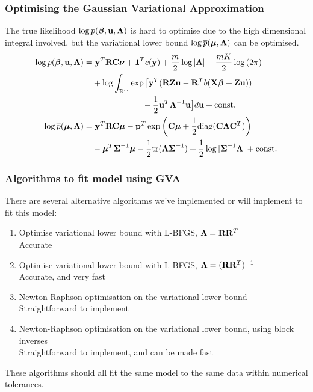 \documentclass{beamer}
\begin{document}
\begin{frame}
\frametitle{Optimising the Gaussian Variational Approximation}
The true likelihood $\log p({\boldsymbol \beta}, {\bf u}, {\boldsymbol \Lambda})$ is hard to optimise due 
to the high dimensional integral involved, but the variational lower bound $\log \overline{p}({\boldsymbol \mu}, {\boldsymbol \Lambda})$ can be optimised.
\begin{align*}
\log p({\boldsymbol \beta}, {\bf u}, {\boldsymbol \Lambda}) &= {\bf y}^T {\bf R} {\bf C} {\boldsymbol \nu} + {\bf 1}^T c({\bf y}) + \frac{m}{2} \log |{\boldsymbol \Lambda}| - \frac{mK}{2} \log{(2 \pi)}\\
&\quad + \log  \int_{\mathbb{R}^{m}} \exp \big[ {\bf y}^T ({\bf R} {\bf Z} {\bf u} - {\bf R}^T b( {\bf X} {\boldsymbol \beta} + {\bf Z} {\bf u})) \\
 &\quad \quad \quad \quad \quad \quad \quad - {\frac{1}{2}} {{\bf u}^T {\boldsymbol \Lambda}^{-1} {\bf u} } \big] d {\bf u} + \text{const.}\\
\log \overline{p}({\boldsymbol \mu}, {\boldsymbol \Lambda}) &= {\bf y}^T {\bf R} {\bf C} {\boldsymbol \mu} - {\bf p}^T \exp{\left({\bf C}{\boldsymbol\mu}+ {\frac{1}{2}}\text{diag}{({\bf C}{\boldsymbol\Lambda}{\bf C}^T)}\right)} \\
& \quad - {\boldsymbol \mu}^T {\boldsymbol \Sigma}^{-1} {\boldsymbol \mu} - {\frac{1}{2}} \text{tr}{({\boldsymbol\Lambda}{\boldsymbol\Sigma}^{-1})} + {\frac{1}{2}} \log{|{\boldsymbol\Sigma}^{-1}{\boldsymbol\Lambda}|} + \text{const.} \\
\end{align*}
\end{frame}

\begin{frame}
\frametitle{Algorithms to fit model using GVA}
There are several alternative algorithms we've implemented or will implement
to fit this model:
\begin{enumerate}
\item Optimise variational lower bound with L-BFGS, ${\boldsymbol \Lambda} = {\bf R} {\bf R}^T$\\
\quad Accurate
\item Optimise variational lower bound with L-BFGS, ${\boldsymbol \Lambda} = ({\bf R} {\bf R}^T)^{-1}$ \\
\quad Accurate, and very fast
\item Newton-Raphson optimisation on the variational lower bound \\
\quad Straightforward to implement
\item Newton-Raphson optimisation on the variational lower bound, using block inverses \\
\quad Straightforward to implement, and can be made fast
\end{enumerate}

These algorithms should all fit the same model to the same data
within numerical tolerances.
\end{frame}
\end{document}

